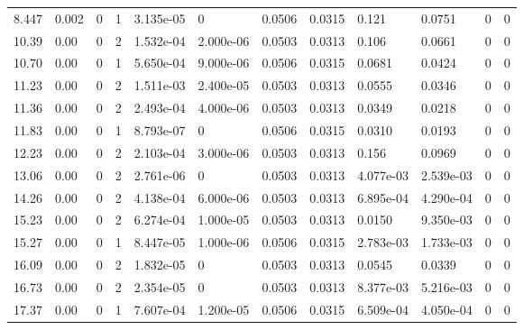 \documentclass[preview]{standalone}
\begin{document}
{{\begin{tabular}{L{1.2cm}C{1.2cm} C{0.3cm}C{0.5cm} C{1.4cm}C{1.4cm} C{1.4cm}C{1.4cm} C{1.6cm}C{1.6cm} C{1.6cm}C{1.6cm}}
  8.447  &  0.002  & 0     &  1 &  3.135e-05  & 0  &  0.0506&   0.0315& 0.121 & 0.0751   &  0 & 0  \\ 
  10.39  &  0.00  & 0     &  2 &  1.532e-04  & 2.000e-06  &  0.0503&   0.0313& 0.106 & 0.0661   &  0 & 0  \\ 
  10.70  &  0.00  & 0     &  1 &  5.650e-04  & 9.000e-06  &  0.0506&   0.0315& 0.0681 & 0.0424   &  0 & 0  \\ 
  11.23  &  0.00  & 0     &  2 &  1.511e-03  & 2.400e-05  &  0.0503&   0.0313& 0.0555 & 0.0346   &  0 & 0  \\ 
  11.36  &  0.00  & 0     &  2 &  2.493e-04  & 4.000e-06  &  0.0503&   0.0313& 0.0349 & 0.0218   &  0 & 0  \\ 
  11.83  &  0.00  & 0     &  1 &  8.793e-07  & 0  &  0.0506&   0.0315& 0.0310 & 0.0193   &  0 & 0  \\ 
  12.23  &  0.00  & 0     &  2 &  2.103e-04  & 3.000e-06  &  0.0503&   0.0313& 0.156 & 0.0969   &  0 & 0  \\ 
  13.06  &  0.00  & 0     &  2 &  2.761e-06  & 0  &  0.0503&   0.0313& 4.077e-03 & 2.539e-03   &  0 & 0  \\ 
  14.26  &  0.00  & 0     &  2 &  4.138e-04  & 6.000e-06  &  0.0503&   0.0313& 6.895e-04 & 4.290e-04   &  0 & 0  \\ 
  15.23  &  0.00  & 0     &  2 &  6.274e-04  & 1.000e-05  &  0.0503&   0.0313& 0.0150 & 9.350e-03   &  0 & 0  \\ 
  15.27  &  0.00  & 0     &  1 &  8.447e-05  & 1.000e-06  &  0.0506&   0.0315& 2.783e-03 & 1.733e-03   &  0 & 0  \\ 
  16.09  &  0.00  & 0     &  2 &  1.832e-05  & 0  &  0.0503&   0.0313& 0.0545 & 0.0339   &  0 & 0  \\ 
  16.73  &  0.00  & 0     &  2 &  2.354e-05  & 0  &  0.0503&   0.0313& 8.377e-03 & 5.216e-03   &  0 & 0  \\ 
  17.37  &  0.00  & 0     &  1 &  7.607e-04  & 1.200e-05  &  0.0506&   0.0315& 6.509e-04 & 4.050e-04   &  0 & 0  \\ 
\hline 
\end{tabular} 

}}
\end{document}
